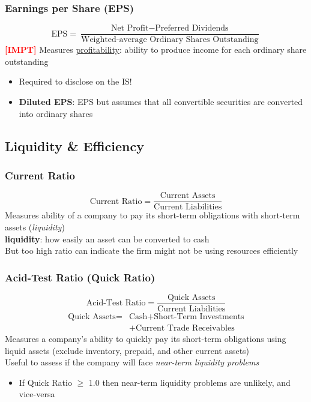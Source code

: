 \documentclass{article}
\newcommand{\impt}[0]{\textcolor{red}{\textbf{[IMPT] }}}
\begin{document}
\begin{multicols}{2}
\subsubsection{Earnings per Share (EPS)}
$$
\text{EPS} = \frac{\text{Net Profit} - \text{Preferred Dividends}}{\text{Weighted-average Ordinary Shares Outstanding}}
$$
\impt Measures \underline{profitability}: ability to produce income for each ordinary share outstanding
\begin{itemize}
	\item Required to disclose on the IS!
	\item \textbf{Diluted EPS}: EPS but assumes that all convertible securities are converted into ordinary shares
\end{itemize}


\subsection{Liquidity \& Efficiency}
\subsubsection{Current Ratio}
$$\text{Current Ratio} = \frac{\text{Current Assets}}{\text{Current Liabilities}}$$
Measures ability of a company to pay its short-term obligations with short-term assets (\textit{liquidity})\\
\textbf{liquidity}: how easily an asset can be converted to cash\\
But too high ratio can indicate the firm might not be using resources efficiently

\subsubsection{Acid-Test Ratio (Quick Ratio)}
$$\text{Acid-Test Ratio} = \frac{\text{Quick Assets}}{\text{Current Liabilities}}$$
\begin{equation*}
	\begin{aligned}
		\text{Quick Assets} = &\text{Cash} + \text{Short-Term Investments}\\
		&+ \text{Current Trade Receivables}
	\end{aligned}
\end{equation*}
Measures a company's ability to quickly pay its short-term obligations using liquid assets (exclude inventory, prepaid, and other current assets)\\
Useful to assess if the company will face \textit{near-term liquidity problems}
\begin{itemize}
	\item If Quick Ratio $\geq$ 1.0 then near-term liquidity problems are unlikely, and vice-versa
\end{itemize}



\end{multicols}
\end{document}
